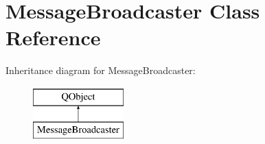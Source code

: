 \hypertarget{class_message_broadcaster}{}\section{Message\+Broadcaster Class Reference}
\label{class_message_broadcaster}
Inheritance diagram for Message\+Broadcaster\+:\begin{figure}[H]
\begin{center}
\leavevmode
\includegraphics[height=2.000000cm]{class_message_broadcaster}
\end{center}
\end{figure}
